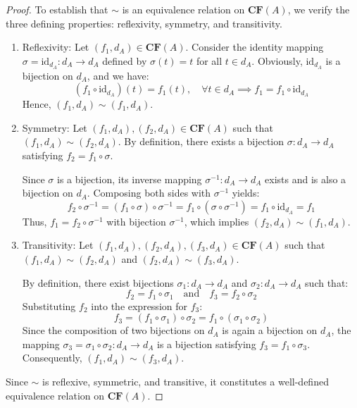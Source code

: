 \documentclass[a4paper,12pt,twoside]{memoir}
\begin{document}
	\begin{proof}
		To establish that $\sim$ is an equivalence relation on $\mathbf{CF}(A)$, we verify the three defining properties: reflexivity, symmetry, and transitivity.
		
		\begin{enumerate}[leftmargin=*]
			\item Reflexivity:
			Let $(f_1, d_A) \in \mathbf{CF}(A)$. Consider the identity mapping $\sigma = \text{id}_{d_A} : d_A \to d_A$ defined by $\sigma(t) = t$ for all $t \in d_A$. Obviously, $\text{id}_{d_A}$ is a bijection on $d_A$, and we have:
			\[
			(f_1 \circ \text{id}_{d_A})(t) = f_1(t), \quad \forall t \in d_A \implies f_1 = f_1 \circ \text{id}_{d_A}
			\]
			Hence, $(f_1, d_A) \sim (f_1, d_A)$.
			
			\item Symmetry:
			Let $(f_1, d_A), (f_2, d_A) \in \mathbf{CF}(A)$ such that $(f_1, d_A) \sim (f_2, d_A)$. By definition, there exists a bijection $\sigma : d_A \to d_A$ satisfying $f_2 = f_1 \circ \sigma$.
			
			Since $\sigma$ is a bijection, its inverse mapping $\sigma^{-1} : d_A \to d_A$ exists and is also a bijection on $d_A$. Composing both sides with $\sigma^{-1}$ yields:
			\[
			f_2 \circ \sigma^{-1} = (f_1 \circ \sigma) \circ \sigma^{-1} = f_1 \circ (\sigma \circ \sigma^{-1}) = f_1 \circ \text{id}_{d_A} = f_1
			\]
			Thus, $f_1 = f_2 \circ \sigma^{-1}$ with bijection $\sigma^{-1}$, which implies $(f_2, d_A) \sim (f_1, d_A)$.
			
			\item Transitivity:
			Let $(f_1, d_A), (f_2, d_A), (f_3, d_A) \in \mathbf{CF}(A)$ such that $(f_1, d_A) \sim (f_2, d_A)$ and $(f_2, d_A) \sim (f_3, d_A)$.
			
			By definition, there exist bijections $\sigma_1 : d_A \to d_A$ and $\sigma_2 : d_A \to d_A$ such that:
			\[
			f_2 = f_1 \circ \sigma_1 \quad \text{and} \quad f_3 = f_2 \circ \sigma_2
			\]
			Substituting $f_2$ into the expression for $f_3$:
			\[
			f_3 = (f_1 \circ \sigma_1) \circ \sigma_2 = f_1 \circ (\sigma_1 \circ \sigma_2)
			\]
			Since the composition of two bijections on $d_A$ is again a bijection on $d_A$, the mapping $\sigma_3 = \sigma_1 \circ \sigma_2 : d_A \to d_A$ is a bijection satisfying $f_3 = f_1 \circ \sigma_3$. Consequently, $(f_1, d_A) \sim (f_3, d_A)$.
		\end{enumerate}
		
		Since $\sim$ is reflexive, symmetric, and transitive, it constitutes a well-defined equivalence relation on $\mathbf{CF}(A)$.
	\end{proof}
	
\end{document}
